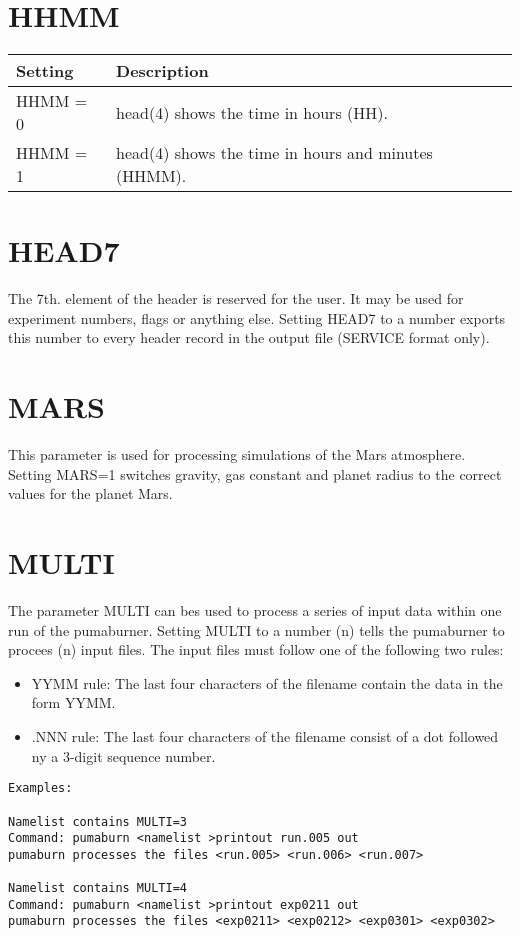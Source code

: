 \section{HHMM}

\begin{tabular}{|l|p{12cm}|}
\hline
Setting & Description \\
\hline
  HHMM  =  0 & head(4) shows the time in hours (HH). \\
  HHMM  =  1 & head(4) shows the time in hours and minutes (HHMM). \\
\hline
\end{tabular}

\section{HEAD7}
The 7th. element of the header is reserved for the user.
It may be used for experiment numbers, flags or anything else.
Setting HEAD7 to a number exports this number to every header record
in the output file (SERVICE format only).

\section{MARS}
This parameter is used for processing simulations of the Mars atmosphere.
Setting MARS=1 switches gravity, gas constant and planet radius
to the correct values for the planet Mars.

\section{MULTI}
The parameter MULTI can bes used to process a series of input data
within one run of the pumaburner. Setting MULTI to a number (n)
tells the pumaburner to procees (n) input files.
The input files must follow one of the following two rules:
\begin{itemize}
\item YYMM rule: The last four characters of the filename 
                 contain the data in the form YYMM.
\item .NNN rule: The last four characters of the filename
                 consist of a dot followed ny a 3-digit sequence number.
\end{itemize}

\begin{verbatim}
Examples:

Namelist contains MULTI=3
Command: pumaburn <namelist >printout run.005 out
pumaburn processes the files <run.005> <run.006> <run.007>

Namelist contains MULTI=4
Command: pumaburn <namelist >printout exp0211 out
pumaburn processes the files <exp0211> <exp0212> <exp0301> <exp0302>
\end{verbatim}


